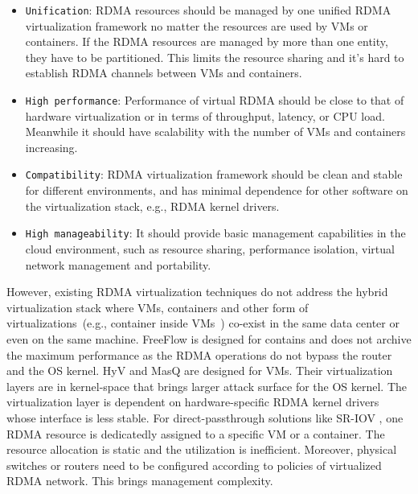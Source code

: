 \begin{itemize}
	\item {\verb|Unification|}: RDMA resources should be managed by one unified RDMA virtualization framework no matter the resources are used by VMs or containers. If the RDMA resources are managed by more than one entity, they have to be partitioned. This limits the resource sharing and it's hard to establish RDMA channels between VMs and containers.
	\item {\verb|High performance|}: Performance of virtual RDMA should be close to that of hardware virtualization or \native in terms of throughput, latency, or CPU load. Meanwhile it should have scalability with the number of VMs and containers increasing.
	\item {\verb|Compatibility|}: RDMA virtualization framework should be clean and stable for different environments, and has minimal dependence for other software on the virtualization stack, e.g., RDMA kernel drivers.
	\item {\verb|High manageability|}: It should provide basic management capabilities in the cloud environment, such as resource sharing, performance isolation, virtual network management and portability.
\end{itemize}

However, existing RDMA virtualization techniques do not address the hybrid virtualization stack where VMs, containers and other form of virtualizations~(e.g., container inside VMs~\cite{containeronvm}) co-exist in the same data center or even on the same machine.
FreeFlow \cite{kim2019freeflow} is designed for contains and does not archive the maximum performance as the RDMA operations do not bypass the router and the OS kernel.
HyV \cite{pfefferle2015hybrid} and MasQ \cite{he2020masq} are designed for VMs. Their virtualization layers are in kernel-space that brings larger attack surface for the OS kernel. The virtualization layer is dependent on hardware-specific RDMA kernel drivers whose interface is less stable. 
For direct-passthrough solutions like SR-IOV \cite{sr-iov}, one RDMA resource is dedicatedly assigned to a specific VM or a container. The resource allocation is static and the utilization is inefficient. Moreover, physical switches or routers need to be configured according to policies of virtualized RDMA network. This brings management complexity.%

